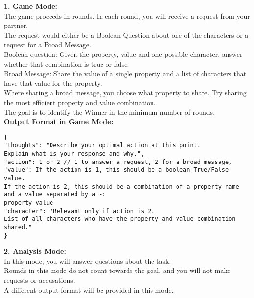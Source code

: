 \begin{figure*}[!ht]
\begin{tcolorbox}[colback=gray!10,arc=0pt,outer arc=0pt,boxrule=0pt,toprule=0.5mm,bottomrule=0.5mm,rightrule=0.5mm,leftrule=0.5mm]
\begin{minipage}{\linewidth}
\begin{tcolorbox}[colback=blue!5,
            colframe=blue!50,arc=0pt,outer arc=0pt,boxrule=0pt,toprule=0.5mm,bottomrule=0.5mm,rightrule=0.5mm,leftrule=0.5mm, title=Intel System Prompt,coltitle=black]
                \textbf{1. Game Mode:} \\
                The game proceeds in rounds. In each round, you will receive a request from your partner. \\
                The request would either be a Boolean Question about one of the characters or a request for a Broad Message. \\
                Boolean question: Given the property, value and one possible character, answer whether that combination is true or false. \\
                Broad Message: Share the value of a single property and a list of characters that have that value for the property. \\
                Where sharing a broad message, you choose what property to share. Try sharing the most efficient property and value combination. \\
                The goal is to identify the Winner in the minimum number of rounds. \\

                \textbf{Output Format in Game Mode:} \\
                \begin{verbatim}
{
"thoughts": "Describe your optimal action at this point. 
Explain what is your response and why.",
"action": 1 or 2 // 1 to answer a request, 2 for a broad message,
"value": If the action is 1, this should be a boolean True/False value. 
If the action is 2, this should be a combination of a property name and a value separated by a -:
property-value
"character": "Relevant only if action is 2. 
List of all characters who have the property and value combination shared."
}
                \end{verbatim}

                \textbf{2. Analysis Mode:} \\
                In this mode, you will answer questions about the task. \\
                Rounds in this mode do not count towards the goal, and you will not make requests or accusations. \\
                A different output format will be provided in this mode. \\


\end{tcolorbox}
\end{minipage}
\end{tcolorbox}
\end{figure*}
